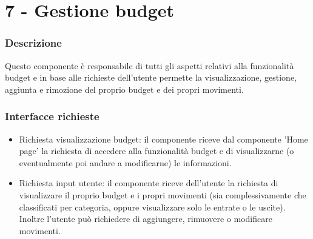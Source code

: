 \documentclass[a4paper,12pt]{article}
\begin{document}
\section*{7 -  Gestione budget}
\subsubsection*{Descrizione}
Questo componente è responsabile di tutti gli aspetti relativi alla funzionalità budget e in base alle richieste dell'utente permette la visualizzazione, gestione, aggiunta e rimozione del proprio budget e dei propri movimenti.
\subsubsection*{Interfacce richieste}
\begin{itemize} \setlength\itemsep{0.01em}
\item {\sffamily Richiesta visualizzazione budget}: il componente riceve dal componente 'Home page'  la richiesta di accedere alla funzionalità budget e di visualizzarne (o eventualmente poi andare a modificarne) le informazioni.
\item {\sffamily Richiesta input utente}: il componente riceve dell'utente la richiesta di visualizzare il proprio budget e i propri movimenti (sia complessivamente che classificati per categoria, oppure visualizzare solo le entrate o le uscite). Inoltre l'utente può richiedere di aggiungere, rimuovere o modificare movimenti.
\end{itemize}
\end{document}
